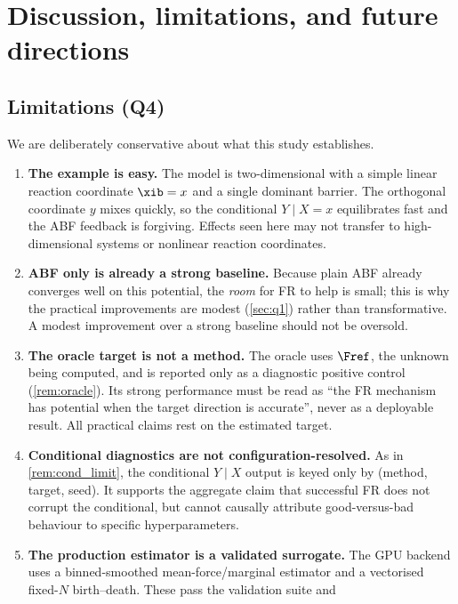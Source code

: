 \section{Discussion, limitations, and future directions}
\label{sec:discussion}

\subsection{Limitations (Q4)}
We are deliberately conservative about what this study establishes.

\begin{enumerate}
  \item \textbf{The example is easy.} The model is two-dimensional with a simple
        linear reaction coordinate $\xib=x$ and a single dominant barrier. The
        orthogonal coordinate $y$ mixes quickly, so the conditional
        $Y\mid X=x$ equilibrates fast and the ABF feedback is forgiving. Effects
        seen here may not transfer to high-dimensional systems or nonlinear
        reaction coordinates.
  \item \textbf{ABF only is already a strong baseline.} Because plain ABF
        already converges well on this potential, the \emph{room} for FR to help
        is small; this is why the practical improvements are modest
        (\cref{sec:q1}) rather than transformative. A modest improvement over a
        strong baseline should not be oversold.
  \item \textbf{The oracle target is not a method.} The oracle uses $\Fref$, the
        unknown being computed, and is reported only as a diagnostic positive
        control (\cref{rem:oracle}). Its strong performance must be read as
        ``the FR mechanism has potential when the target direction is accurate'',
        never as a deployable result. All practical claims rest on the
        estimated target.
  \item \textbf{Conditional diagnostics are not configuration-resolved.} As in
        \cref{rem:cond_limit}, the conditional $Y\mid X$ output is keyed only by
        (method, target, seed). It supports the aggregate claim that successful
        FR does not corrupt the conditional, but cannot causally attribute
        good-versus-bad behaviour to specific hyperparameters.
  \item \textbf{The production estimator is a validated surrogate.} The GPU
        backend uses a binned-smoothed mean-force/marginal estimator and a
        vectorised fixed-$N$ birth--death. These pass the validation suite and

\end{enumerate}
